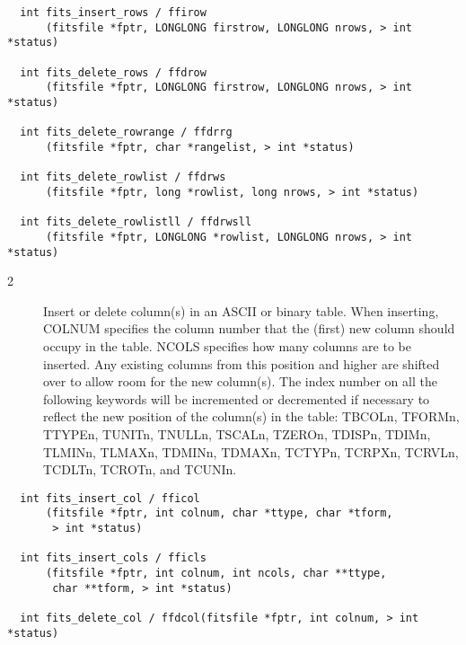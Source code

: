 \documentclass[11pt]{book}
\begin{document}
\begin{verbatim}
  int fits_insert_rows / ffirow
      (fitsfile *fptr, LONGLONG firstrow, LONGLONG nrows, > int *status)

  int fits_delete_rows / ffdrow
      (fitsfile *fptr, LONGLONG firstrow, LONGLONG nrows, > int *status)

  int fits_delete_rowrange / ffdrrg
      (fitsfile *fptr, char *rangelist, > int *status)

  int fits_delete_rowlist / ffdrws
      (fitsfile *fptr, long *rowlist, long nrows, > int *status)

  int fits_delete_rowlistll / ffdrwsll
      (fitsfile *fptr, LONGLONG *rowlist, LONGLONG nrows, > int *status)
\end{verbatim}

\begin{description}
\item[2 ] Insert or delete column(s) in an ASCII or binary
    table.  When inserting, COLNUM specifies the column number that the
    (first) new column should occupy in the table.  NCOLS specifies how
    many columns are to be inserted. Any existing columns from this
    position and higher are shifted over to allow room for the new
    column(s).  The index number on all the following keywords will be
    incremented or decremented if necessary to reflect the new position
    of the column(s) in the table:  TBCOLn, TFORMn, TTYPEn, TUNITn,
    TNULLn, TSCALn, TZEROn, TDISPn, TDIMn, TLMINn, TLMAXn, TDMINn,
    TDMAXn, TCTYPn, TCRPXn, TCRVLn, TCDLTn, TCROTn,
   and TCUNIn. \label{fficol} \label{fficls} \label{ffdcol}
\end{description}

\begin{verbatim}
  int fits_insert_col / fficol
      (fitsfile *fptr, int colnum, char *ttype, char *tform,
       > int *status)

  int fits_insert_cols / fficls
      (fitsfile *fptr, int colnum, int ncols, char **ttype,
       char **tform, > int *status)

  int fits_delete_col / ffdcol(fitsfile *fptr, int colnum, > int *status)
\end{verbatim}
\end{document}
